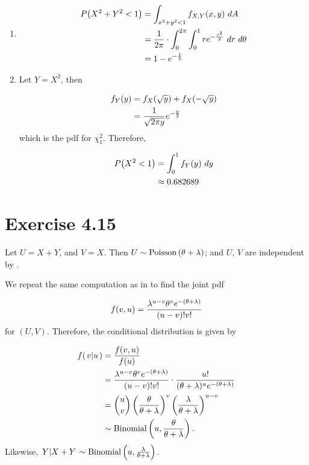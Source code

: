 \documentclass[12pt,letterpaper,reqno]{amsart}
\numberwithin{equation}{subsection}
\begin{document}
\begin{enumerate}[label=(\alph*),leftmargin=*]
    \item 
    
    \begin{align*}
        \fun{P}{X^2+Y^2 < 1} &= \myint{\fun{f_{X,Y}}{x,y}}{A}{x^2+y^2<1}{} \\
        &= \frac{1}{2\pi} \cdot \myint{\myint{r e^{-\frac{r^2}{2}}}{r}{0}{1}}{\theta}{0}{2\pi} \\
        &= 1- e^{-\frac{1}{2}}
    \end{align*}
    
    \item Let $Y = X^2$, then
    
    \begin{align*}
        \fun{f_Y}{y} &= \fun{f_X}{\sqrt{y}} + \fun{f_X}{-\sqrt{y}} \\
        &= \frac{1}{\sqrt{2\pi y}} e^{- \frac{y}{2}} \\
    \end{align*}
    which is the pdf for $\chi_1^2$. Therefore,
    
    \begin{align*}
        \fun{P}{X^2 < 1} &= \myint{f_Y(y)}{y}{0}{1} \\
        &\approx 0.682689
    \end{align*}
\end{enumerate}

\newpage
\section{Exercise 4.15}

Let $U = X + Y$, and $V = X$. Then $U \sim \poissondist{\theta + \lambda}$; and $U$, $V$ are independent by \cite[Theorem 4.3.2 on page 158]{Berger-Casella}.

We repeat the same computation as in \cite[Example 4.3.1 on page 157]{Berger-Casella} to find the joint pdf

\[ \fun{f}{v,u} = \frac{\lambda^{u-v} \theta^v e^{-(\theta + \lambda)}}{(u-v)!v!} \]
for $(U,V)$. Therefore, the conditional distribution is given by

\begin{align*}
    \fun{f}{\conditbar{v}{u}} &= \frac{\fun{f}{v,u}}{\fun{f}{u}} \\
    &= \frac{\lambda^{u-v} \theta^v e^{-(\theta + \lambda)}}{(u-v)!v!} \cdot \frac{u!}{(\theta + \lambda)^u e^{-(\theta + \lambda)}} \\
    &= \binom{u}{v} \left( \frac{\theta}{\theta + \lambda} \right)^v \left( \frac{\lambda}{\theta + \lambda} \right)^{u-v} \\
    &\sim \binomdist{u, \frac{\theta}{\theta + \lambda}}.
\end{align*}
Likewise, $\conditbar{Y}{X+Y} \sim \binomdist{u, \frac{\lambda}{\theta + \lambda}}$.
\end{document}
